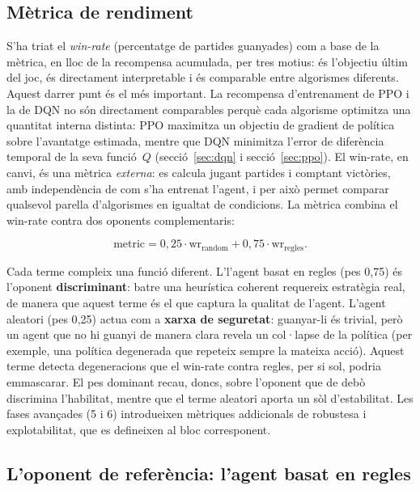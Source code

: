 \subsection*{Mètrica de rendiment}

S'ha triat el \emph{win-rate} (percentatge de partides guanyades) com a base de la
mètrica, en lloc de la recompensa acumulada, per tres motius: és l'objectiu últim del joc,
és directament interpretable i és comparable entre algorismes diferents. Aquest darrer
punt és el més important. La recompensa d'entrenament de PPO i la de DQN no són
directament comparables perquè cada algorisme optimitza una quantitat interna distinta:
PPO maximitza un objectiu de gradient de política sobre l'avantatge estimada, mentre que
DQN minimitza l'error de diferència temporal de la seva funció~$Q$ (secció~\ref{sec:dqn} i
secció~\ref{sec:ppo}). El win-rate, en canvi, és una mètrica
\emph{externa}: es calcula jugant partides i comptant victòries, amb independència de com
s'ha entrenat l'agent, i per això permet comparar qualsevol parella d'algorismes en
igualtat de condicions. La mètrica combina el win-rate contra dos oponents complementaris:

\begin{equation}
  \text{metric} = 0{,}25 \cdot \text{wr}_{\text{random}} + 0{,}75 \cdot \text{wr}_{\text{regles}}.
  \label{eq:metric}
\end{equation}

Cada terme compleix una funció diferent. L'l'agent basat en regles (pes 0{,}75) és l'oponent
\textbf{discriminant}: batre una heurística coherent requereix estratègia real, de manera
que aquest terme és el que captura la qualitat de l'agent. L'agent aleatori
(pes 0{,}25) actua com a \textbf{xarxa de seguretat}: guanyar-li és trivial, però un agent
que no hi guanyi de manera clara revela un col·lapse de la política (per exemple, una
política degenerada que repeteix sempre la mateixa acció). Aquest terme detecta
degeneracions que el win-rate contra regles, per si sol, podria emmascarar. El pes
dominant recau, doncs, sobre l'oponent que de debò discrimina l'habilitat, mentre que el
terme aleatori aporta un sòl d'estabilitat. Les fases avançades (5 i 6) introdueixen
mètriques addicionals de robustesa i explotabilitat, que es defineixen al bloc
corresponent.

\subsection*{L'oponent de referència: l'agent basat en regles}

